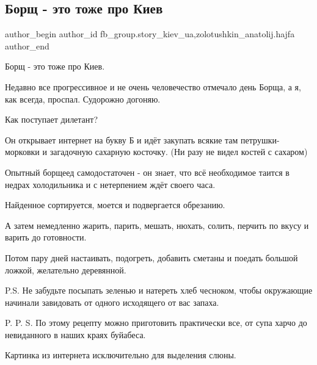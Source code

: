  
 
 
 
 
 
\subsection{Борщ - это тоже про Киев}
\label{sec:21_11_2021.fb.fb_group.story_kiev_ua.1.borsch_eto_tozhe_pro_kiev}
 
\ifcmt
 author_begin
   author_id fb_group.story_kiev_ua,zolotushkin_anatolij.hajfa
 author_end
\fi

Борщ - это тоже про Киев.

Недавно все прогрессивное и не очень человечество отмечало день Борща, а я, как
всегда, проспал. Судорожно догоняю.


Как поступает дилетант?

Он открывает интернет на букву Б и идёт закупать всякие там петрушки-морковки и
загадочную сахарную косточку. (Ни разу не видел костей с сахаром)

Опытный борщеед самодостаточен - он знает, что всё необходимое таится в недрах
холодильника и с нетерпением ждёт своего часа.

Найденное сортируется, моется и подвергается обрезанию.

А затем немедленно  жарить, парить, мешать,  нюхать, солить, перчить по вкусу и
варить до готовности.

Потом пару дней настаивать, подогреть, добавить сметаны и поедать большой
ложкой, желательно деревянной.

P.S. Не забудьте посыпать зеленью и натереть хлеб чесноком, чтобы окружающие
начинали завидовать от одного исходящего от вас запаха.

P. P. S. По этому рецепту можно приготовить практически все, от супа харчо до
невиданного в наших краях буйабеса.

Картинка из интернета исключительно для выделения слюны.

